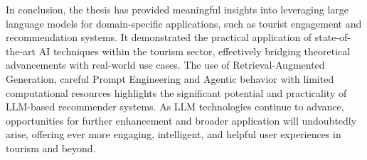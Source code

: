 In conclusion, the thesis has provided meaningful insights into leveraging large language models for domain-specific applications, such as tourist engagement and recommendation systems. It demonstrated the practical application of state-of-the-art AI techniques within the tourism sector, effectively bridging theoretical advancements with real-world use cases. The use of Retrieval-Augmented Generation, careful Prompt Engineering and Agentic behavior with limited computational resources highlights the significant potential and practicality of LLM-based recommender systems. As LLM technologies continue to advance, opportunities for further enhancement and broader application will undoubtedly arise, offering ever more engaging, intelligent, and helpful user experiences in tourism and beyond.